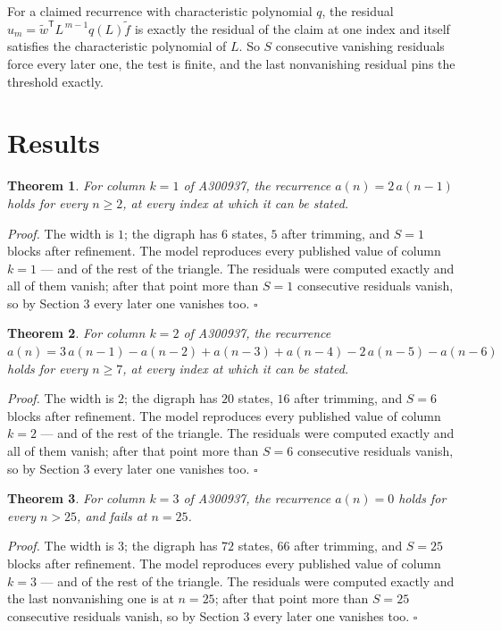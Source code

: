 \documentclass[11pt]{article}
\newtheorem{theorem}{Theorem}
\theoremstyle{definition}
\begin{document}
For a claimed recurrence with characteristic polynomial $q$, the residual $u_m = \tilde w^{\mathsf T}L^{\,m-1}q(L)\tilde f$ is exactly the residual of the claim at one index and itself satisfies the characteristic polynomial of $L$. So $S$ consecutive vanishing residuals force every later one, the test is finite, and the last nonvanishing residual pins the threshold exactly.

\section{Results}

\begin{theorem} For column $k = 1$ of A300937, the recurrence $a(n) = 2\,a(n-1)$ holds for every $n \ge 2$, at every index at which it can be stated.\end{theorem}

{\itshape Proof.} The width is $1$; the digraph has $6$ states, $5$ after trimming, and $S = 1$ blocks after refinement. The model reproduces every published value of column $k = 1$ --- and of the rest of the triangle. The residuals were computed exactly and all of them vanish; after that point more than $S = 1$ consecutive residuals vanish, so by Section 3 every later one vanishes too. $\square$

\begin{theorem} For column $k = 2$ of A300937, the recurrence $a(n) = 3\,a(n-1) - a(n-2) + a(n-3) + a(n-4) - 2\,a(n-5) - a(n-6)$ holds for every $n \ge 7$, at every index at which it can be stated.\end{theorem}

{\itshape Proof.} The width is $2$; the digraph has $20$ states, $16$ after trimming, and $S = 6$ blocks after refinement. The model reproduces every published value of column $k = 2$ --- and of the rest of the triangle. The residuals were computed exactly and all of them vanish; after that point more than $S = 6$ consecutive residuals vanish, so by Section 3 every later one vanishes too. $\square$

\begin{theorem} For column $k = 3$ of A300937, the recurrence $a(n) = 0$ holds for every $n > 25$, and fails at $n = 25$.\end{theorem}

{\itshape Proof.} The width is $3$; the digraph has $72$ states, $66$ after trimming, and $S = 25$ blocks after refinement. The model reproduces every published value of column $k = 3$ --- and of the rest of the triangle. The residuals were computed exactly and the last nonvanishing one is at $n = 25$; after that point more than $S = 25$ consecutive residuals vanish, so by Section 3 every later one vanishes too. $\square$
\end{document}
